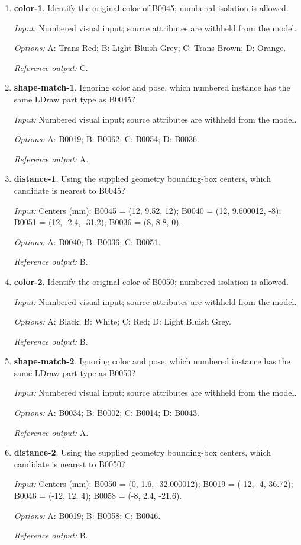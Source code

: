 \begin{enumerate}
\item \textbf{color-1}. Identify the original color of B0045; numbered isolation is allowed.\par {\small \textit{Input:} Numbered visual input; source attributes are withheld from the model. \par\textit{Options:} A: Trans Red; B: Light Bluish Grey; C: Trans Brown; D: Orange. \par\textit{Reference output:} C.}
\item \textbf{shape-match-1}. Ignoring color and pose, which numbered instance has the same LDraw part type as B0045?\par {\small \textit{Input:} Numbered visual input; source attributes are withheld from the model. \par\textit{Options:} A: B0019; B: B0062; C: B0054; D: B0036. \par\textit{Reference output:} A.}
\item \textbf{distance-1}. Using the supplied geometry bounding-box centers, which candidate is nearest to B0045?\par {\small \textit{Input:} Centers (mm): B0045 = (12, 9.52, 12); B0040 = (12, 9.600012, -8); B0051 = (12, -2.4, -31.2); B0036 = (8, 8.8, 0). \par\textit{Options:} A: B0040; B: B0036; C: B0051. \par\textit{Reference output:} B.}
\item \textbf{color-2}. Identify the original color of B0050; numbered isolation is allowed.\par {\small \textit{Input:} Numbered visual input; source attributes are withheld from the model. \par\textit{Options:} A: Black; B: White; C: Red; D: Light Bluish Grey. \par\textit{Reference output:} B.}
\item \textbf{shape-match-2}. Ignoring color and pose, which numbered instance has the same LDraw part type as B0050?\par {\small \textit{Input:} Numbered visual input; source attributes are withheld from the model. \par\textit{Options:} A: B0034; B: B0002; C: B0014; D: B0043. \par\textit{Reference output:} A.}
\item \textbf{distance-2}. Using the supplied geometry bounding-box centers, which candidate is nearest to B0050?\par {\small \textit{Input:} Centers (mm): B0050 = (0, 1.6, -32.000012); B0019 = (-12, -4, 36.72); B0046 = (-12, 12, 4); B0058 = (-8, 2.4, -21.6). \par\textit{Options:} A: B0019; B: B0058; C: B0046. \par\textit{Reference output:} B.}

\end{enumerate}
